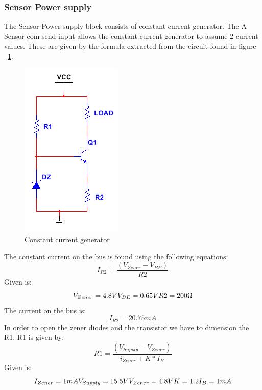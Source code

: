 \subsubsection{Sensor Power supply}
The Sensor Power supply block consists of constant current generator. The A Sensor com send input allows the constant current generator to assume 2 current values. These are given by the formula extracted from the circuit found in figure ~\ref{fig:ccg}.\\
\begin{figure}[H]
	\centering
	\includegraphics[scale=0.8]{billeder/ccg}
	\caption{Constant current generator}
	\label{fig:ccg}
\end{figure}
The constant current on the bus is found using the following equations:
\begin{equation}
	I_{R2}= \frac{(V_{Zener}-V_{BE})}{R2}
\end{equation}
Given is:
\begin{equation}
	V_{Zener} = 4.8V $\\$
	V_{BE} = 0.65V $\\$
	R2 = 200\Omega
\end{equation}
The current on the bus is:
\begin{equation}
	I_{R2}= 20.75 mA
\end{equation}
In order to open the zener diodes and the transistor we have to dimension the R1. R1 is given by:
\begin{equation}
	R1= \frac{(V_{Supply}-V_{Zener})}{i_{Zener}+K * I_B}
\end{equation}
Given is:
\begin{equation}
	I_{Zener} = 1 mA $\\$
	V_{Supply} = 15.5V $\\$
	V_{Zener} = 4.8V $\\$
	K = 1.2 $\\$
	I_B = 1 mA
\end{equation}
